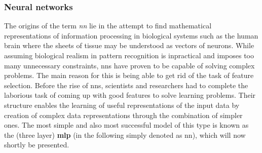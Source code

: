 \subsubsection{Neural networks}
\label{sub:neural_networks}

The origins of the term \textit{\gls{nn}} lie in the attempt to find mathematical representations of information processing in biological systems such as the human brain where the sheets of tissue may be understood as vectors of neurons. While assuming biological realism in pattern recognition is inpractical and imposes too many unnecessary constraints, \gls{nn}s have proven to be capable of solving complex problems. The main reason for this is being able to get rid of the task of feature selection. Before the rise of \gls{nn}s, scientists and researchers had to complete the laborious task of coming up with good features to solve learning problems. Their structure enables the learning of useful representations of the input data by creation of complex data representations through the combination of simpler ones. The most simple and also most successful model of this type is known as the (three layer) \textbf{\gls{mlp}} (in the following simply denoted as \gls{nn}), which will now shortly be presented.

